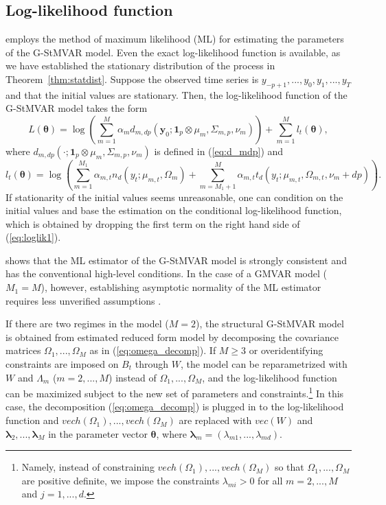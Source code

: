 \documentclass[nojss]{jss} %
\begin{document}
\subsection{Log-likelihood function}\label{sec:loglik}
 employs the method of maximum likelihood (ML) for estimating the parameters of the G-StMVAR model. Even the exact log-likelihood function is available, as we have established the stationary distribution of the process in Theorem~\ref{thm:statdist}.  Suppose the observed time series is $y_{-p+1},...,y_0,y_1,...,y_T$ and that the initial values are stationary.  Then, the log-likelihood function of the G-StMVAR model takes the form
\begin{equation}\label{eq:loglik1}
L(\boldsymbol{\theta})=\log\left(\sum_{m=1}^M\alpha_m d_{m,dp}(\boldsymbol{y}_0;\boldsymbol{1}_p\otimes\mu_m,\Sigma_{m,p},\nu_m) \right) + \sum_{m=1}^M l_t(\boldsymbol{\theta}),
\end{equation}
where $d_{m,dp}(\cdot;\boldsymbol{1}_p\otimes\mu_m,\Sigma_{m,p},\nu_m)$ is defined in (\ref{eq:d_mdp}) and
\begin{equation}\label{eq:loglik2}
l_t(\boldsymbol{\theta}) = \log\left(\sum_{m=1}^{M_1}  \alpha_{m,t}n_d(y_t;\mu_{m,t},\Omega_{m})  + \sum_{m=M_1 + 1}^M  \alpha_{m,t}t_d(y_t;\mu_{m,t},\Omega_{m,t},\nu_m + dp  ) \right).
\end{equation}
If stationarity of the initial values seems unreasonable,  one can condition on the initial values and base the estimation on the conditional log-likelihood function, which is obtained by dropping the first term on the right hand side of (\ref{eq:loglik1}).

\citet[Theorem 3]{Virolainen2:2021} shows that the ML estimator of the G-StMVAR model is strongly consistent and has the conventional high-level conditions. In the case of a GMVAR model ($M_1=M$), however, establishing asymptotic normality of the ML estimator requires less unverified assumptions \cite[Theorem 3]{Kalliovirta+Meitz+Saikkonen:2016}.

If there are two regimes in the model ($M=2$),  the structural G-StMVAR model is obtained from estimated reduced form model by decomposing the covariance matrices $\Omega_1,...,\Omega_M$ as in (\ref{eq:omega_decomp}).  If $M\geq 3$ or overidentifying constraints are imposed on $B_t$ through $W$,  the model can be reparametrized with $W$ and $\Lambda_m$ ($m=2,...,M$) instead of $\Omega_1,...,\Omega_M$,  and the log-likelihood function can be maximized subject to the new set of parameters and constraints.\footnote{Namely,  instead of constraining $vech(\Omega_1),...,vech(\Omega_M)$ so that $\Omega_1,...,\Omega_M$ are positive definite,  we impose the constraints $\lambda_{mi}>0$ for all $m=2,...,M$ and $j=1,...,d$.} In this case, the decomposition (\ref{eq:omega_decomp}) is plugged in to the log-likelihood function and $vech(\Omega_1),...,vech(\Omega_M)$ are replaced with $vec(W)$ and $\boldsymbol{\lambda}_2,...,\boldsymbol{\lambda}_M$ in the parameter vector $\boldsymbol{\theta}$,  where $\boldsymbol{\lambda}_m=(\lambda_{m1},...,\lambda_{md})$.
\end{document}
